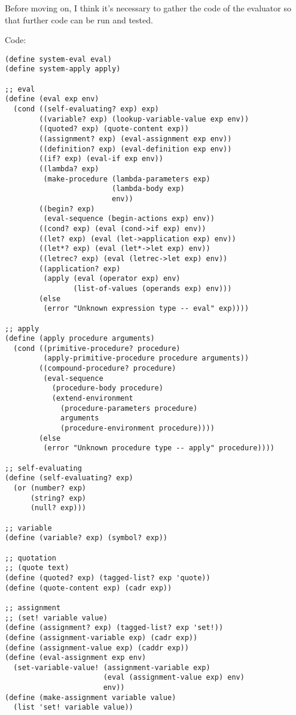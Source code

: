 \documentclass[../main.tex]{subfiles}
\begin{document}
Before moving on, I think it's necessary to gather the code of the evaluator so that further code can be run and tested.

Code:

\begin{lstlisting}
(define system-eval eval)
(define system-apply apply)

;; eval
(define (eval exp env)
  (cond ((self-evaluating? exp) exp)
        ((variable? exp) (lookup-variable-value exp env))
        ((quoted? exp) (quote-content exp))
        ((assignment? exp) (eval-assignment exp env))
        ((definition? exp) (eval-definition exp env))
        ((if? exp) (eval-if exp env))
        ((lambda? exp)
         (make-procedure (lambda-parameters exp)
                         (lambda-body exp)
                         env))
        ((begin? exp)
         (eval-sequence (begin-actions exp) env))
        ((cond? exp) (eval (cond->if exp) env))
        ((let? exp) (eval (let->application exp) env))
        ((let*? exp) (eval (let*->let exp) env))
        ((letrec? exp) (eval (letrec->let exp) env))
        ((application? exp)
         (apply (eval (operator exp) env)
                (list-of-values (operands exp) env)))
        (else
         (error "Unknown expression type -- eval" exp))))

;; apply
(define (apply procedure arguments)
  (cond ((primitive-procedure? procedure)
         (apply-primitive-procedure procedure arguments))
        ((compound-procedure? procedure)
         (eval-sequence
           (procedure-body procedure)
           (extend-environment
             (procedure-parameters procedure)
             arguments
             (procedure-environment procedure))))
        (else
         (error "Unknown procedure type -- apply" procedure))))

;; self-evaluating
(define (self-evaluating? exp)
  (or (number? exp)
      (string? exp)
      (null? exp)))

;; variable
(define (variable? exp) (symbol? exp))

;; quotation
;; (quote text)
(define (quoted? exp) (tagged-list? exp 'quote))
(define (quote-content exp) (cadr exp))

;; assignment
;; (set! variable value)
(define (assignment? exp) (tagged-list? exp 'set!))
(define (assignment-variable exp) (cadr exp))
(define (assignment-value exp) (caddr exp))
(define (eval-assignment exp env)
  (set-variable-value! (assignment-variable exp)
                       (eval (assignment-value exp) env)
                       env))
(define (make-assignment variable value)
  (list 'set! variable value))


\end{lstlisting}
\end{document}
